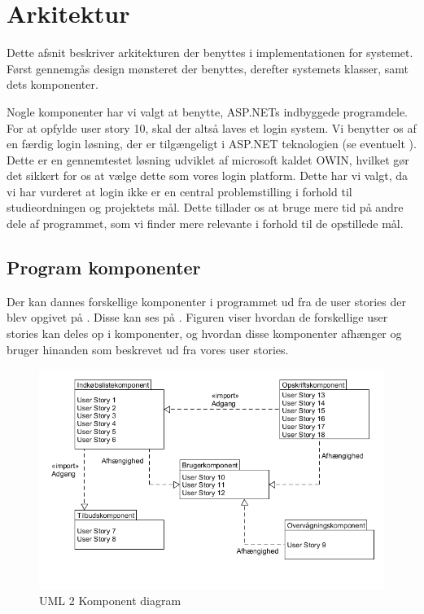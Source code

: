 \section{Arkitektur}
Dette afsnit beskriver arkitekturen der benyttes i implementationen for systemet.
Først gennemgås design mønsteret der benyttes, derefter systemets klasser, samt dets komponenter.

Nogle komponenter har vi valgt at benytte, ASP.NETs indbyggede programdele.
For at opfylde user story 10, skal der altså laves et login system.
Vi benytter os af en færdig login løsning, der er tilgængeligt i ASP.NET teknologien (se eventuelt ).
Dette er en gennemtestet løsning udviklet af microsoft kaldet OWIN, hvilket gør det sikkert for os at vælge dette som vores login platform.
Dette har vi valgt, da vi har vurderet at login ikke er en central problemstilling i forhold til studieordningen og projektets mål.
Dette tillader os at bruge mere tid på andre dele af programmet, som vi finder mere relevante i forhold til de opstillede mål.



\subsection{Program komponenter}\label{subsec:komp}

Der kan dannes forskellige komponenter i programmet ud fra de user stories der blev opgivet på .
Disse kan ses på .
Figuren viser hvordan de forskellige user stories kan deles op i komponenter, og hvordan disse komponenter afhænger og bruger hinanden som beskrevet ud fra vores user stories.

\begin{figure}
	\vspace{-20pt}
	\begin{center}
		\includegraphics[scale=0.6]{images/Diagrams/Komponenter.png}
	\end{center}
	\vspace{-20pt}
	\caption{UML 2 Komponent diagram }
	\label{figure:komp}
	\vspace{-20pt}
\end{figure}


